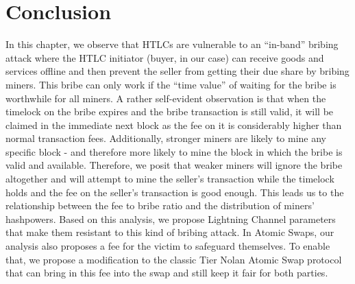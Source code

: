 \section{Conclusion}
In this chapter, we observe that HTLCs are vulnerable to an ``in-band'' bribing attack where the HTLC initiator (buyer, in our case) can receive goods and services offline and then prevent the seller from getting their due share by bribing miners. This bribe can only work if the ``time value'' of waiting for the bribe is worthwhile for all miners. A rather self-evident observation is that when the timelock on the bribe expires and the bribe transaction is still valid, it will be claimed in the immediate next block as the fee on it is considerably higher than normal transaction fees. Additionally, stronger miners are likely to mine any specific block - and therefore more likely to mine the block in which the bribe is valid and available. Therefore, we posit that weaker miners will ignore the bribe altogether and will attempt to mine the seller's transaction while the timelock holds and the fee on the seller's transaction is good enough. This leads us to the relationship between the fee to bribe ratio and the distribution of miners' hashpowers. Based on this analysis, we propose Lightning Channel parameters that make them resistant to this kind of bribing attack. In Atomic Swaps, our analysis also proposes a fee for the victim to safeguard themselves. To enable that, we propose a modification to the classic Tier Nolan Atomic Swap protocol that can bring in this fee into the swap and still keep it fair for both parties.